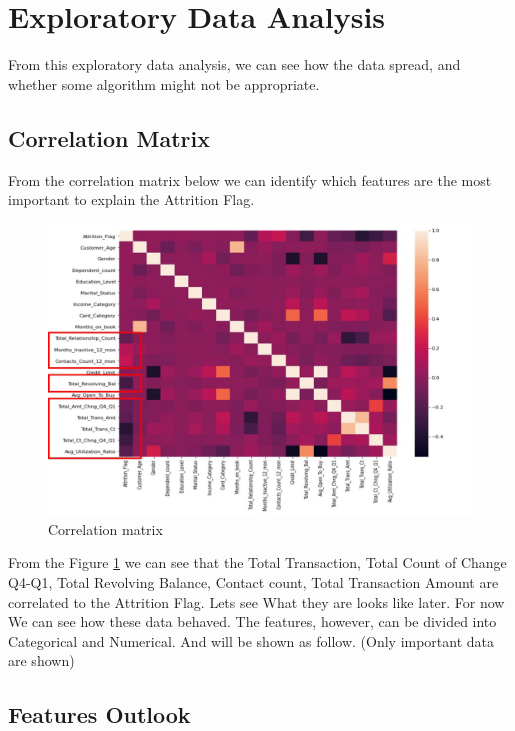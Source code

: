 \documentclass{homeworg}
\begin{document}
\section{Exploratory Data Analysis}
From this exploratory data analysis, we can see how the data spread, and whether some algorithm might not be appropriate. 
\subsection{Correlation Matrix}
From the correlation matrix below we can identify which features are the most important to explain the Attrition Flag. 
\begin{figure}[!h]
    \centering
    \includegraphics[scale=0.9]{figure/CM_correlation_matrixs.jpg}
    \caption{Correlation matrix}
    \label{fig:cormat}
\end{figure}
From the Figure \ref{fig:cormat} we can see that the Total Transaction, Total Count of Change Q4-Q1, Total Revolving Balance, Contact count, Total Transaction Amount are correlated to the Attrition Flag. Lets see What they are looks like later. 
For now We can see how these data behaved.
The features, however, can be divided into Categorical and Numerical. And will be shown as follow. (Only important data are shown) \newpage
\subsection{Features Outlook}
\end{document}
